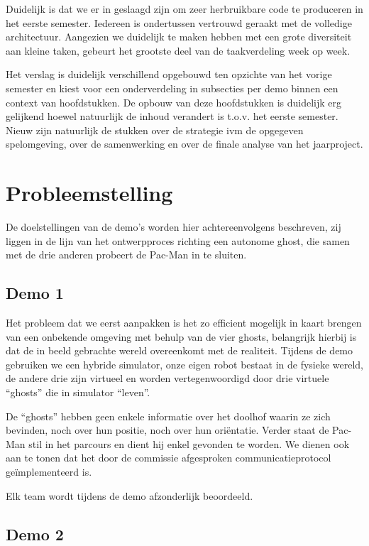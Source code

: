 \documentclass[12pt,a4paper]{report}
\begin{document}
Duidelijk is dat we er in geslaagd zijn om zeer herbruikbare code te produceren in het eerste semester. Iedereen is ondertussen vertrouwd geraakt met de volledige architectuur. Aangezien we duidelijk te maken hebben met een grote diversiteit aan kleine taken, gebeurt het grootste deel van de taakverdeling week op week.

Het verslag is duidelijk verschillend opgebouwd ten opzichte van het vorige semester en kiest voor een onderverdeling in subsecties per demo binnen een context van hoofdstukken. De opbouw van deze hoofdstukken is duidelijk erg gelijkend hoewel natuurlijk de inhoud verandert is t.o.v. het eerste semester. Nieuw zijn natuurlijk de stukken over de strategie ivm de opgegeven spelomgeving, over de samenwerking en over de finale analyse van het jaarproject.

\chapter{Probleemstelling}

De doelstellingen van de demo's worden hier achtereenvolgens beschreven, zij liggen in de lijn van het ontwerpproces richting een autonome ghost, die samen met de drie anderen probeert de Pac-Man in te sluiten.

\section{Demo 1}

Het probleem dat we eerst aanpakken is het zo efficient mogelijk in kaart brengen van een onbekende omgeving met behulp van de vier ghosts, belangrijk hierbij is dat de in beeld gebrachte wereld overeenkomt met de realiteit. Tijdens de demo gebruiken we een hybride simulator, onze eigen robot bestaat in de fysieke wereld, de andere drie zijn virtueel en worden vertegenwoordigd door drie virtuele ``ghosts'' die in simulator ``leven''.

De ``ghosts'' hebben geen enkele informatie over het doolhof waarin ze zich bevinden, noch over hun positie, noch over hun ori\"entatie. Verder staat de Pac-Man stil in het parcours en dient hij enkel gevonden te worden. We dienen ook aan te tonen dat het door de commissie afgesproken communicatieprotocol ge\"implementeerd is.

Elk team wordt tijdens de demo afzonderlijk beoordeeld.
 
\section{Demo 2}
 
\end{document}
